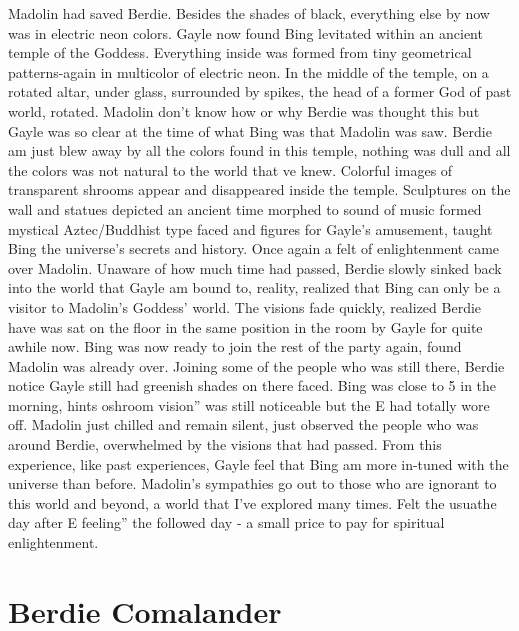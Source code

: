 \documentclass[12pt]{book}
\begin{document}
Madolin had saved Berdie. Besides the shades of black, everything else by now was in electric neon colors. Gayle now found Bing levitated within an ancient temple of the Goddess. Everything inside was formed from tiny geometrical patterns-again in multicolor of electric neon. In the middle of the temple, on a rotated altar, under glass, surrounded by spikes, the head of a former God of past world, rotated. Madolin don't know how or why Berdie was thought this but Gayle was so clear at the time of what Bing was that Madolin was saw. Berdie am just blew away by all the colors found in this temple, nothing was dull and all the colors was not natural to the world that ve knew. Colorful images of transparent shrooms appear and disappeared inside the temple. Sculptures on the wall and statues depicted an ancient time morphed to sound of music formed mystical Aztec/Buddhist type faced and figures for Gayle's amusement, taught Bing the universe's secrets and history. Once again a felt of enlightenment came over Madolin. Unaware of how much time had passed, Berdie slowly sinked back into the world that Gayle am bound to, reality, realized that Bing can only be a visitor to Madolin's Goddess' world. The visions fade quickly, realized Berdie have was sat on the floor in the same position in the room by Gayle for quite awhile now. Bing was now ready to join the rest of the party again, found Madolin was already over. Joining some of the people who was still there, Berdie notice Gayle still had greenish shades on there faced. Bing was close to 5 in the morning, hints oshroom vision'' was still noticeable but the E had totally wore off. Madolin just chilled and remain silent, just observed the people who was around Berdie, overwhelmed by the visions that had passed. From this experience, like past experiences, Gayle feel that Bing am more in-tuned with the universe than before. Madolin's sympathies go out to those who are ignorant to this world and beyond, a world that I've explored many times. Felt the usuathe day after E feeling'' the followed day - a small price to pay for spiritual enlightenment.



\chapter{Berdie Comalander}
\end{document}
